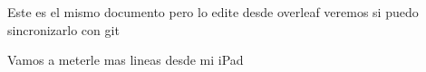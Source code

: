 \documentclass{article}
\begin{document}
	Este  es el mismo documento pero lo edite desde overleaf veremos si  puedo sincronizarlo con git
	
	Vamos a meterle mas lineas desde mi iPad
\end{document}
